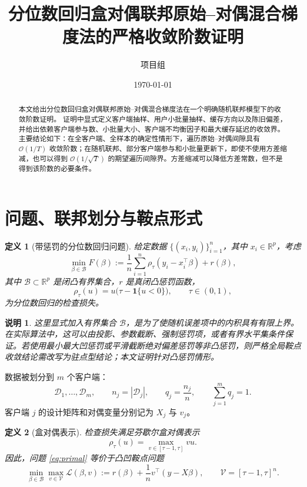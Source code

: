 \documentclass[UTF8,a4paper,11pt]{ctexart}
\title{分位数回归盒对偶联邦原始--对偶混合梯度法的严格收敛阶数证明}
\author{项目组}
\date{\today}
\newtheorem{definition}{定义}
\newtheorem{remark}{说明}
\newcommand{\R}{\mathbb{R}}
\newcommand{\V}{\mathcal{V}}
\newcommand{\B}{\mathcal{B}}
\begin{document}
\maketitle

\begin{abstract}
本文给出分位数回归盒对偶联邦原始--对偶混合梯度法在一个明确随机联邦模型下的收敛阶数证明。
证明中显式定义客户端抽样、用户小批量抽样、缓存方向以及陈旧偏差，并给出依赖客户端参与数、小批量大小、客户端不均衡因子和最大缓存延迟的收敛界。
主要结论如下：在全客户端、全样本的确定性情形下，遍历原始--对偶间隙具有 $\mathcal{O}(1/T)$ 收敛阶数；在随机联邦、部分客户端参与和小批量更新下，即使不使用方差缩减，也可以得到 $\mathcal{O}(1/\sqrt{T})$ 的期望遍历间隙界。方差缩减可以降低方差常数，但不是得到该阶数的必要条件。
\end{abstract}

\section{问题、联邦划分与鞍点形式}

\begin{definition}[带惩罚的分位数回归问题]
给定数据 $\{(x_i,y_i)\}_{i=1}^n$，其中 $x_i\in\R^p$，考虑
\begin{equation}
    \min_{\beta\in\B}
    F(\beta)
    :=
    \frac{1}{n}\sum_{i=1}^n
    \rho_\tau(y_i-x_i^\top\beta)
    +
    r(\beta),
    \label{eq:primal}
\end{equation}
其中 $\B\subset\R^p$ 是闭凸有界集合，$r$ 是真闭凸惩罚函数，
\[
    \rho_\tau(u)=u\bigl(\tau-\mathbf{1}\{u<0\}\bigr),
    \qquad \tau\in(0,1),
\]
为分位数回归的检查损失。
\end{definition}

\begin{remark}
这里显式加入有界集合 $\B$，是为了使随机误差项中的内积具有有限上界。在实际算法中，这可以由投影、参数截断、强制惩罚项，或者有界水平集条件保证。若使用最小最大凹惩罚或平滑截断绝对偏差惩罚等非凸惩罚，则严格全局鞍点收敛结论需改写为驻点型结论；本文证明针对凸惩罚情形。
\end{remark}

数据被划分到 $m$ 个客户端：
\[
    \mathcal{D}_1,\ldots,\mathcal{D}_m,\qquad
    n_j=|\mathcal{D}_j|,\qquad
    q_j=\frac{n_j}{n},\qquad
    \sum_{j=1}^m q_j=1.
\]
客户端 $j$ 的设计矩阵和对偶变量分别记为 $X_j$ 与 $v_j$。

\begin{definition}[盒对偶表示]
检查损失满足芬歇尔盒对偶表示
\begin{equation}
    \rho_\tau(u)
    =
    \max_{v\in[\tau-1,\tau]} vu.
    \label{eq:box-dual}
\end{equation}
因此，问题 \eqref{eq:primal} 等价于凸凹鞍点问题
\begin{equation}
    \min_{\beta\in\B}
    \max_{v\in\V}
    \mathcal{L}(\beta,v)
    :=
    r(\beta)
    +
    \frac{1}{n}v^\top(y-X\beta),
    \qquad
    \V=[\tau-1,\tau]^n.
    \label{eq:saddle}
\end{equation}
\end{definition}
\end{document}
